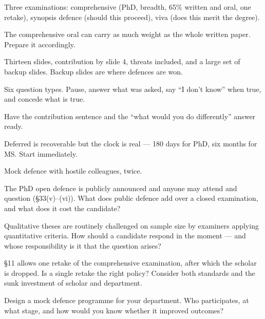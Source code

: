 \begin{chaptersummary}
\begin{tight}
  \item Three examinations: comprehensive (PhD, breadth, 65\% written and oral,
    one retake), synopsis defence (should this proceed), viva (does this merit
    the degree).
  \item The comprehensive oral can carry as much weight as the whole written
    paper. Prepare it accordingly.
  \item Thirteen slides, contribution by slide 4, threats included, and a large
    set of backup slides. Backup slides are where defences are won.
  \item Six question types. Pause, answer what was asked, say ``I don't know''
    when true, and concede what is true.
  \item Have the contribution sentence and the ``what would you do
    differently'' answer ready.
  \item Deferred is recoverable but the clock is real --- 180 days for PhD, six
    months for MS. Start immediately.
  \item Mock defence with hostile colleagues, twice.
\end{tight}
\end{chaptersummary}

\begin{reviewq}
  \item The PhD open defence is publicly announced and anyone may attend and
    question (\S33(v)--(vi)). What does public defence add over a closed
    examination, and what does it cost the candidate?
  \item Qualitative theses are routinely challenged on sample size by examiners
    applying quantitative criteria. How should a candidate respond in the
    moment --- and whose responsibility is it that the question arises?
  \item \S11 allows one retake of the comprehensive examination, after which
    the scholar is dropped. Is a single retake the right policy? Consider both
    standards and the sunk investment of scholar and department.
  \item Design a mock defence programme for your department. Who participates,
    at what stage, and how would you know whether it improved outcomes?
\end{reviewq}
